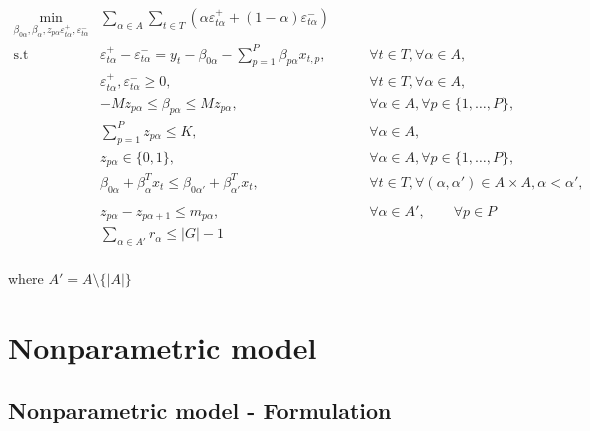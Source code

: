 \begin{eqnarray}
\underset{\beta_{0\alpha},\beta_\alpha,z_{p \alpha} \varepsilon_{t \alpha}^{+},\varepsilon_{t \alpha}^{-}}{\text{min}} & \sum_{\alpha \in A} \sum_{t\in T}\left(\alpha\varepsilon_{t \alpha}^{+}+(1-\alpha)\varepsilon_{t\alpha}^{-}\right) \label{eq:mipgr0} \\
\mbox{s.t } & \varepsilon_{t \alpha}^{+}-\varepsilon_{t \alpha}^{-}=y_{t}-\beta_{0 \alpha}-\sum_{p=1}^{P}\beta_{p \alpha}x_{t,p},& \qquad\forall t \in T ,\forall \alpha \in A, \label{eq:mipgr1}\\
& \varepsilon_{t \alpha}^{+},\varepsilon_{t \alpha}^{-}\geq0,&\qquad\forall t \in T ,\forall \alpha \in A, \label{eq:mipgr2}\\
& - M z_{p \alpha} \leq \beta_{p \alpha} \leq M z_{p \alpha},&\qquad \forall \alpha \in A, \forall p\in\{1,\dots,P\}, \label{eq:mipgr3}\\
& \sum_{p=1}^P z_{p \alpha} \leq K, & \qquad \forall \alpha \in A, \label{eq:mipgr4}\\
& z_{p \alpha} \in \{0,1\},&\qquad \forall \alpha \in A, \forall p\in\{1,\dots,P\}, \label{eq:mipgr5}\\
& \beta_{0\alpha} + \beta_{\alpha}^T x_{t} \leq \beta_{0\alpha'} + \beta_{\alpha'}^T x_{t}, & \qquad \forall t \in T, \forall (\alpha, \alpha') \in A \times A,  \alpha < \alpha',\nonumber\\ \label{eq:mipgr6} \\
& z_{p\alpha} - z_{p\alpha+1} \leq m_{p\alpha}, & \qquad \forall \alpha \in A', \qquad \forall p \in P  \\
& \sum_{\alpha \in A'} r_\alpha \leq |G| - 1 
\label{eq:mipgr} \\
\end{eqnarray}

where \(A' = A\setminus \{|A|\}\) \normalsize

\section{Nonparametric model}\label{nonparametric-model}

\subsection{Nonparametric model -
Formulation}\label{nonparametric-model---formulation}

\tiny

